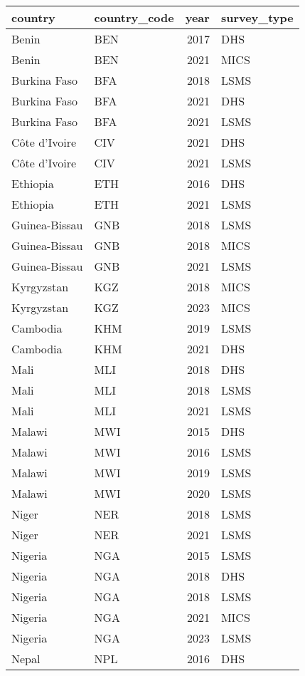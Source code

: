 \begin{table}[ht]
\centering
\begin{tabular}{llrl}
  \hline
country & country\_code & year & survey\_type \\ 
  \hline
Benin & BEN & 2017 & DHS \\ 
  Benin & BEN & 2021 & MICS \\ 
  Burkina Faso & BFA & 2018 & LSMS \\ 
  Burkina Faso & BFA & 2021 & DHS \\ 
  Burkina Faso & BFA & 2021 & LSMS \\ 
  Côte d’Ivoire & CIV & 2021 & DHS \\ 
  Côte d’Ivoire & CIV & 2021 & LSMS \\ 
  Ethiopia & ETH & 2016 & DHS \\ 
  Ethiopia & ETH & 2021 & LSMS \\ 
  Guinea-Bissau & GNB & 2018 & LSMS \\ 
  Guinea-Bissau & GNB & 2018 & MICS \\ 
  Guinea-Bissau & GNB & 2021 & LSMS \\ 
  Kyrgyzstan & KGZ & 2018 & MICS \\ 
  Kyrgyzstan & KGZ & 2023 & MICS \\ 
  Cambodia & KHM & 2019 & LSMS \\ 
  Cambodia & KHM & 2021 & DHS \\ 
  Mali & MLI & 2018 & DHS \\ 
  Mali & MLI & 2018 & LSMS \\ 
  Mali & MLI & 2021 & LSMS \\ 
  Malawi & MWI & 2015 & DHS \\ 
  Malawi & MWI & 2016 & LSMS \\ 
  Malawi & MWI & 2019 & LSMS \\ 
  Malawi & MWI & 2020 & LSMS \\ 
  Niger & NER & 2018 & LSMS \\ 
  Niger & NER & 2021 & LSMS \\ 
  Nigeria & NGA & 2015 & LSMS \\ 
  Nigeria & NGA & 2018 & DHS \\ 
  Nigeria & NGA & 2018 & LSMS \\ 
  Nigeria & NGA & 2021 & MICS \\ 
  Nigeria & NGA & 2023 & LSMS \\ 
  Nepal & NPL & 2016 & DHS \\ 

\end{tabular}
\end{table}
